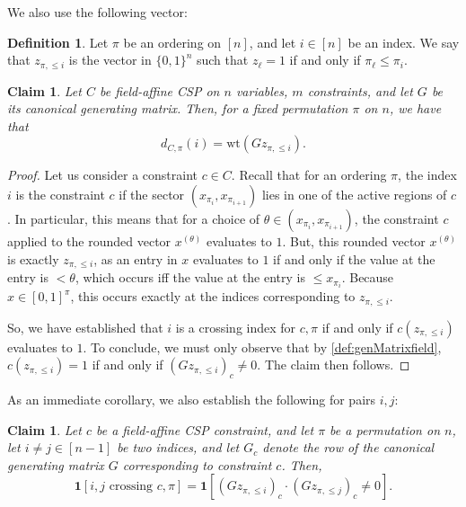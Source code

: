 \documentclass[11pt]{article}
\newtheorem{claim}[theorem]{Claim}
\theoremstyle{definition}
\newtheorem{definition}{Definition}[section]
\newcommand{\zo}{\{0, 1\}}
\newcommand{\wt}{\mathrm{wt}}
\begin{document}
We also use the following vector:

\begin{definition}
	Let $\pi$ be an ordering on $[n]$, and let $i \in [n]$ be an index. We say that $z_{\pi, \leq i}$ is the vector in $\zo^n$ such that $z_{\ell} = 1$ if and only if $\pi_{\ell} \leq \pi_i$.
\end{definition}

\begin{claim}\label{clm:crossingEquivalenceGeneral}
	Let $C$ be field-affine CSP on $n$ variables, $m$ constraints, and let $G$ be its canonical generating matrix. Then, for a fixed permutation $\pi$ on $n$, we have that 
	\[
	d_{C, \pi}(i) = \wt(G z_{\pi, \leq i}).
	\]
\end{claim}

\begin{proof}
	Let us consider a constraint $c \in C$. Recall that for an ordering $\pi$, the index $i$ is  the constraint $c$ if the sector $(x_{\pi_i}, x_{\pi_{i+1}})$ lies in one of the active regions of $c$. In particular, this means that for a choice of $\theta \in (x_{\pi_i}, x_{\pi_{i+1}})$, the constraint $c$ applied to the rounded vector $x^{(\theta)}$ evaluates to $1$. But, this rounded vector $x^{(\theta)}$ is exactly $z_{\pi, \leq i}$, as an entry in $x$ evaluates to $1$ if and only if the value at the entry is $< \theta$, which occurs iff the value at the entry is $\leq x_{\pi_i}$. Because $x \in [0,1]^{\pi}$, this occurs exactly at the indices corresponding to $z_{\pi, \leq i}$.

    So, we have established that $i$ is a crossing index for $c, \pi$ if and only if $c(z_{\pi, \leq i})$ evaluates to $1$. To conclude, we must only observe that by \cref{def:genMatrixfield}, $c(z_{\pi, \leq i}) = 1$ if and only if $(Gz_{\pi, \leq i})_c \neq 0$. The claim then follows. 
\end{proof}

As an immediate corollary, we also establish the following for pairs $i,j$:

\begin{claim}\label{clm:crossingProductGeneral}
	Let $c$ be a field-affine CSP constraint, and let $\pi$ be a permutation on $n$, let $i \neq j \in [n-1]$ be two indices, and let $G_c$ denote the row of the canonical generating matrix $G$ corresponding to constraint $c$. Then, 
	\[
	\mathbf{1}[i,j \text{ crossing } c, \pi] = \mathbf{1} [(G z_{\pi, \leq i})_c \cdot (G z_{\pi, \leq j})_c \neq 0].
	\]
\end{claim}
\end{document}
